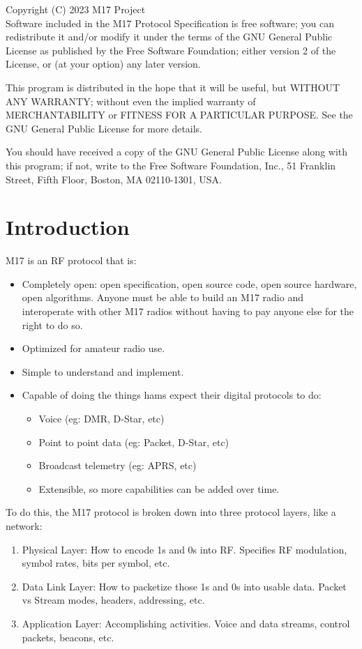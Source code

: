 \documentclass[a4paper,11pt]{book}
\begin{document}
Copyright (C) 2023  M17 Project \\

Software included in the M17 Protocol Specification is free software; you can redistribute it and/or modify it under the terms of the GNU General Public License as published by the Free Software Foundation; either version 2 of the License, or (at your option) any later version.

This program is distributed in the hope that it will be useful, but WITHOUT ANY WARRANTY; without even the implied warranty of MERCHANTABILITY or FITNESS FOR A PARTICULAR PURPOSE.  See the GNU General Public License for more details.

You should have received a copy of the GNU General Public License along with this program; if not, write to the Free Software Foundation, Inc., 51 Franklin Street, Fifth Floor, Boston, MA  02110-1301, USA.

\chapter{Introduction}

M17 is an RF protocol that is:

\begin{itemize}
	\item
	Completely open: open specification, open source code, open source hardware, open algorithms. Anyone must be able to build an M17 radio  and interoperate with other M17 radios without having to pay anyone else for the right to do so.
	\item
	Optimized for amateur radio use.
	\item
	Simple to understand and implement.
	\item
	Capable of doing the things hams expect their digital protocols to do:
	\begin{itemize}
		\item
		Voice (eg: DMR, D-Star, etc)
		\item
		Point to point data (eg: Packet, D-Star, etc)
		\item
		Broadcast telemetry (eg: APRS, etc)
		\item
		Extensible, so more capabilities can be added over time.
	\end{itemize}
\end{itemize}

To do this, the M17 protocol is broken down into three protocol layers,
like a network:

\begin{enumerate}
	\def\labelenumi{\arabic{enumi}.}
	\item
	Physical Layer: How to encode 1s and 0s into RF\@. Specifies RF modulation, symbol rates, bits per symbol, etc.
	\item
	Data Link Layer: How to packetize those 1s and 0s into usable data. Packet vs Stream modes, headers, addressing, etc.
	\item
	Application Layer: Accomplishing activities. Voice and data streams, control packets, beacons, etc.
\end{enumerate}
\end{document}
